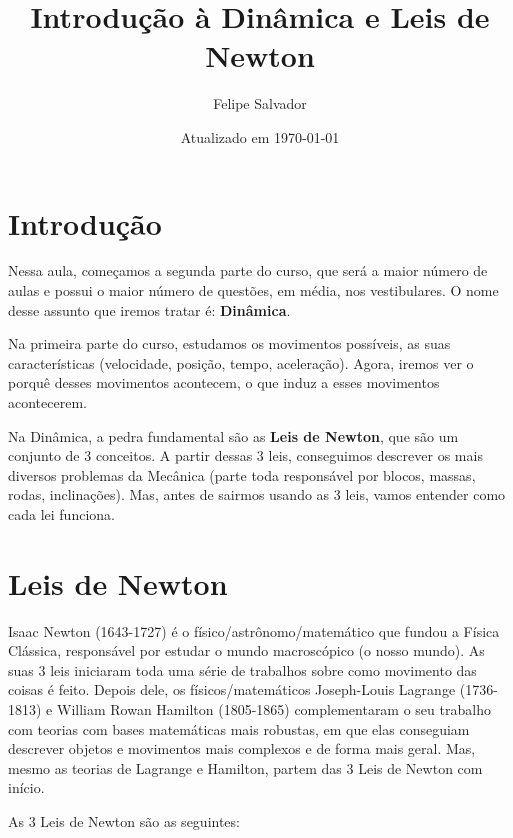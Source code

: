 \documentclass[12pt]{extarticle}
\title{Introdução à Dinâmica e Leis de Newton}
\author{Felipe Salvador}
\date{Atualizado em \today}
\newcommand{\<}{\langle}
\renewcommand{\>}{\rangle}
\theoremstyle{definition}
\begin{document}
\maketitle

\section{Introdução}

Nessa aula, começamos a segunda parte do curso, que será a maior número de aulas e possui o maior número de questões, em média, nos vestibulares.  O nome desse assunto que iremos tratar é: \textbf{Dinâmica}.

Na primeira parte do curso, estudamos os movimentos possíveis, as suas características (velocidade, posição, tempo, aceleração). Agora, iremos ver o porquê desses movimentos acontecem, o que induz a esses movimentos acontecerem.

Na Dinâmica, a pedra fundamental são as \textbf{Leis de Newton}, que são um conjunto de 3 conceitos. A partir dessas 3 leis, conseguimos descrever os mais diversos problemas da Mecânica (parte toda responsável por blocos, massas, rodas, inclinações). Mas, antes de sairmos usando as 3 leis, vamos entender como cada lei funciona.

\section{Leis de Newton}

Isaac Newton (1643-1727) é o físico/astrônomo/matemático que fundou a Física Clássica, responsável por estudar o mundo macroscópico (o nosso mundo). As suas 3 leis iniciaram toda uma série de trabalhos sobre como movimento das coisas é feito. Depois dele, os físicos/matemáticos Joseph-Louis Lagrange (1736-1813) e William Rowan Hamilton (1805-1865) complementaram o seu trabalho com teorias com bases matemáticas mais robustas, em que elas conseguiam descrever objetos e movimentos mais complexos e de forma mais geral. Mas, mesmo as teorias de Lagrange e Hamilton, partem das 3 Leis de Newton com início.

As 3 Leis de Newton são as seguintes:
\end{document}
